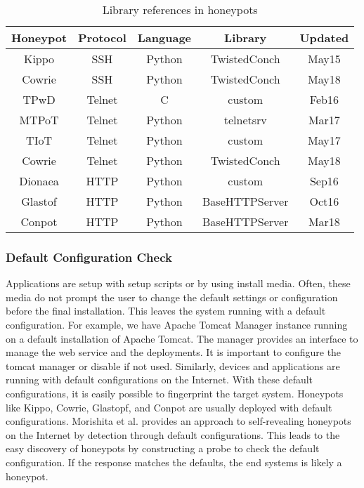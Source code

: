 \begin{table}
\begin{tabular}{||c c c c c||} 
 \hline
 Honeypot & Protocol & Language & Library & Updated \\ [0.5ex] 
 \hline
 Kippo  & SSH    & Python &  TwistedConch & May15 \\ 
 Cowrie & SSH    & Python &  TwistedConch & May18 \\
 TPwD   & Telnet & C      &  custom       & Feb16 \\
 MTPoT  & Telnet & Python &  telnetsrv    & Mar17 \\
 TIoT   & Telnet & Python &  custom       & May17 \\
 Cowrie & Telnet & Python &  TwistedConch & May18 \\
 Dionaea& HTTP   & Python &  custom       & Sep16 \\
 Glastof& HTTP   & Python &  BaseHTTPServer& Oct16 \\
 Conpot & HTTP   & Python &  BaseHTTPServer& Mar18 \\ [1ex] 
 \hline
\end{tabular}
\caption{Library references in honeypots}
\label{library}
\end{table}

\subsubsection{Default Configuration Check}
Applications are setup with setup scripts or by using install media. Often, these media do not prompt the user to change the default settings or configuration before the final installation. This leaves the system running with a default configuration. For example, we have Apache Tomcat Manager instance running on a default installation of Apache Tomcat. The manager provides an interface to manage the web service and the deployments. It is important to configure the tomcat manager or disable if not used. Similarly, devices and applications are running with default configurations on the Internet. With these default configurations, it is easily possible to fingerprint the target system. Honeypots like Kippo, Cowrie, Glastopf, and Conpot are usually deployed with default configurations. Morishita et al. \cite{morishita} provides an approach to self-revealing honeypots on the Internet by detection through default configurations.  This leads to the easy discovery of honeypots by constructing a probe to check the default configuration. If the response matches the defaults, the end systems is likely a honeypot.
\newline
